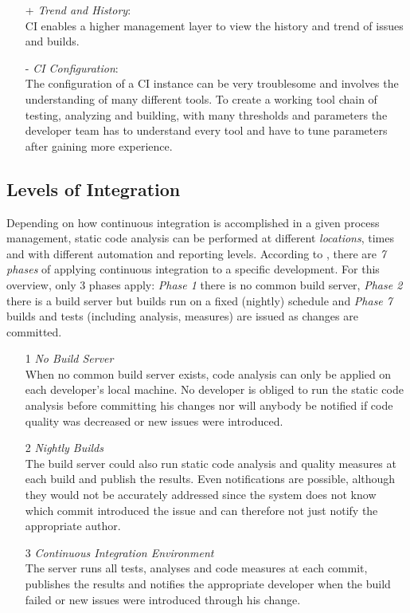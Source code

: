 \documentclass[conference]{IEEEtran}
\begin{document}
\begin{itemize}
	\item[+] \textit{Trend and History}:\\
	CI enables a higher management layer to view the history and trend of issues and builds.
	
	\item[-] \textit{CI Configuration}:\\
	The configuration of a CI instance can be very troublesome and involves the understanding of many different tools. To create a working tool chain of testing, analyzing and building, with many thresholds and parameters the developer team has to understand every tool and have to tune parameters after gaining more experience.
\end{itemize}



\subsection{Levels of Integration}
\label{subsec:ci_levels_of_integration}
Depending on how continuous integration is accomplished in a given process management, static code analysis can be performed at different \textit{locations}, times and with different automation and reporting levels. According to \cite[p. 6ff]{Jenkins:Smart:2011}, there are \textit{7 phases} of applying continuous integration to a specific development. For this overview, only 3 phases apply: \textit{Phase 1} there is no common build server, \textit{Phase 2} there is a build server but builds run on a fixed (nightly) schedule and \textit{Phase 7} builds and tests (including analysis, measures) are issued as changes are committed.

\begin{itemize}
	\item[1] \textit{No Build Server} \\
	When no common build server exists, code analysis can only be applied on each developer's local machine. No developer is obliged to run the static code analysis before committing his changes nor will anybody be notified if code quality was decreased or new issues were introduced.
	
	
	\item[2] \textit{Nightly Builds} \\
	The build server could also run static code analysis and quality measures at each build and publish the results. Even notifications are possible, although they would not be accurately addressed since the system does not know which commit introduced the issue and can therefore not just notify the appropriate author.
	
	\item[3] \textit{Continuous Integration Environment} \\
	The server runs all tests, analyses and code measures at each commit, publishes the results and notifies the appropriate developer when the build failed or new issues were introduced through his change.
\end{itemize}
\end{document}
